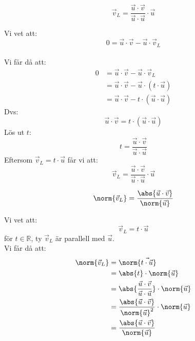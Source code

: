 \begin{sats}
    \begin{equation}
      \vec{v}_L = \frac{\vec{u} \cdot \vec{v}}{\vec{u} \cdot \vec{u}} \cdot \vec{u}
    \end{equation}
\end{sats}
\begin{bevis}
    Vi vet att:
    \[
    0 = \vec{u} \cdot \vec{v} - \vec{u} \cdot \vec{v}_L
    \]\\
    Vi får då att:
    \begin{align*}
    0 &= \vec{u} \cdot \vec{v} - \vec{u} \cdot \vec{v}_L \\
    &= \vec{u} \cdot \vec{v} -  \vec{u} \cdot (t \cdot \vec{u}) \\
    &= \vec{u} \cdot \vec{v} - t \cdot (\vec{u} \cdot \vec{u})
    \end{align*}
    Dvs: 
    \[
        \vec{u} \cdot \vec{v} = t \cdot (\vec{u} \cdot \vec{u})
    \]
    Lös ut $t$:
    \[
        t = \frac{\vec{u} \cdot \vec{v}}{\vec{u} \cdot \vec{u}}
    \]
    Eftersom $\vec{v}_L = t \cdot \vec{u}$ får vi att:
    \[
        \vec{v}_L = \frac{\vec{u} \cdot \vec{v}}{\vec{u} \cdot \vec{u}} \cdot \vec{u}
    \]

\end{bevis}
\newpage
\begin{sats}
  \begin{equation}
    \norm{\vec{v}_L} = \frac{\abs{\vec{u}\cdot \vec{v}}}{\norm{\vec{u}}}
  \end{equation}
\end{sats}
\begin{bevis}
    Vi vet att:
    \[
        \vec{v}_L = t \cdot \vec{u}
    \]
    för $t \in \mathbb{R}$, ty $\vec{v}_L$ är parallell med $\vec{u}$.\\
    Vi får då att:
    \begin{align*}
    \norm{\vec{v}_L} &= \norm{\vec{t \cdot \vec{u}}} \\
    &= \abs{t} \cdot \norm{\vec{u}} \\
    &= \abs{\frac{\vec{u} \cdot \vec{v}}{\vec{u} \cdot \vec{u}}} \cdot \norm{\vec{u}} \\
    &= \frac{\abs{\vec{u} \cdot \vec{v}}}{\norm{\vec{u}}^2} \cdot \norm{\vec{u}} \\
    &= \frac{\abs{\vec{u} \cdot \vec{v}}}{\norm{\vec{u}}}
    \end{align*}
    
\end{bevis}

